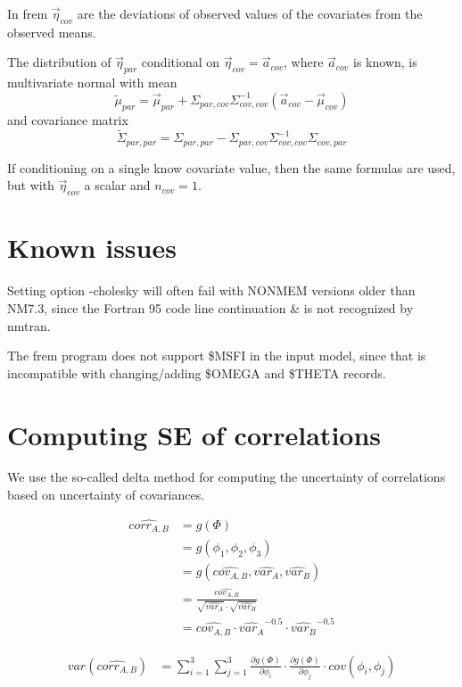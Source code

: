 In frem $\vec{\eta}_{cov}$ are the deviations of observed values of the covariates from the observed means.

The distribution of $\vec{\eta}_{par}$ conditional on $\vec{\eta}_{cov}= \vec{a}_{cov}$,
where $\vec{a}_{cov}$ is known,
is
multivariate normal with mean
\[
\tilde{\mu}_{par}=\vec{\mu}_{par}+\Sigma_{par,cov}\Sigma_{cov,cov}^{-1}\left(\vec{a}_{cov}-\vec{\mu}_{cov}\right)
\]
and covariance matrix
\[
\tilde{\Sigma}_{par,par}=\Sigma_{par,par}-\Sigma_{par,cov}\Sigma_{cov,cov}^{-1}\Sigma_{cov,par}
\]

If conditioning on a single know covariate value, then the same formulas are used, but with $\vec{\eta}_{cov}$ a scalar
and $n_{cov}=1$.


\section{Known issues}
Setting option -cholesky will often fail with NONMEM versions older than NM7.3, since the Fortran 95 code line continuation
\& is not recognized by nmtran.

The frem program does not support \$MSFI in the input model, since that is incompatible
with changing/adding \$OMEGA and \$THETA records.





\section{Computing SE of correlations}
We use the so-called delta method for computing the uncertainty of correlations based on uncertainty of covariances.

\[
\begin{split}
\hat{corr_{A,B}}&=g(\Phi)\\
&=g\left(\phi_1,\phi_2,\phi_3\right)\\
&=g\left(\hat{cov_{A,B}},\hat{var_{A}},\hat{var_{B}}\right)\\
&=\frac{\hat{cov_{A,B}}}{\sqrt{\hat{var_{A}}}\cdot \sqrt{\hat{var_{B}}}}\\
&=\hat{cov_{A,B}}\cdot \hat{var_{A}}^{-0.5} \cdot \hat{var_{B}}^{-0.5}
\end{split}
\]

\[
\begin{split}
var\left(\hat{corr_{A,B}}\right)&=\sum_{i=1}^{3}\sum_{j=1}^{3} \frac{\partial g(\Phi)}{\partial \phi_{i}} \cdot \frac{\partial g(\Phi)}{\partial \phi_{j}}\cdot cov\left(\phi_{i},\phi_{j} \right)
\end{split}
\]

